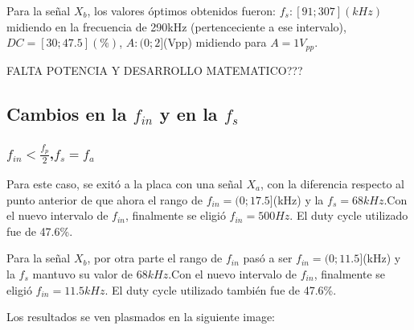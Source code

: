 \documentclass[../../ASSD_TP1_G7.tex]{subfiles}
\begin{document}
Para la señal $X_{b}$, los valores óptimos obtenidos fueron: $f_{s}:[91;307](kHz)$
midiendo en la frecuencia de 290kHz (pertenceciente a ese intervalo),
$DC=[30;47.5](\%)$, $A:(0;2]$(Vpp) midiendo para $A=1V_{pp}$.

FALTA POTENCIA Y DESARROLLO MATEMATICO???

\subsection{Cambios en la $f_{in}$ y en la $f_{s}$}

\subsubsection{$f_{in}<\frac{f_{p}}{2}$,$f_{s}=f_{a}$}

Para este caso, se exitó a la placa con una señal $X_{a}$, con la
diferencia respecto al punto anterior de que ahora el rango de $f_{in}=(0;17.5]$(kHz)
y la $f_{s}=68kHz.$Con el nuevo intervalo de $f_{in}$, finalmente
se eligió $f_{in}=500Hz.$ El duty cycle utilizado fue de 47.6\%.

Para la señal $X_{b}$, por otra parte el rango de $f_{in}$ pasó
a ser $f_{in}=(0;11.5]$(kHz) y la $f_{s}$ mantuvo su valor de $68kHz.$Con
el nuevo intervalo de $f_{in}$, finalmente se eligió $f_{in}=11.5kHz.$
El duty cycle utilizado también fue de 47.6\%.

Los resultados se ven plasmados en la siguiente image:
\end{document}
